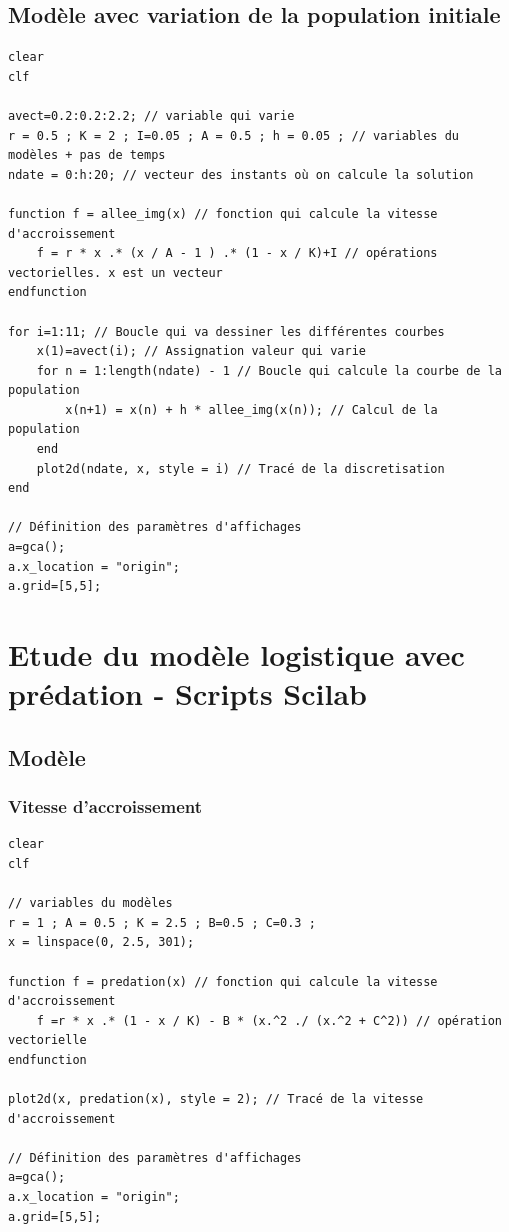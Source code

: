 \documentclass{article}
\begin{document}
\subsection{Modèle avec variation de la population initiale}

\begin{verbatim}
clear
clf

avect=0.2:0.2:2.2; // variable qui varie
r = 0.5 ; K = 2 ; I=0.05 ; A = 0.5 ; h = 0.05 ; // variables du modèles + pas de temps
ndate = 0:h:20; // vecteur des instants où on calcule la solution

function f = allee_img(x) // fonction qui calcule la vitesse d'accroissement
    f = r * x .* (x / A - 1 ) .* (1 - x / K)+I // opérations vectorielles. x est un vecteur
endfunction

for i=1:11; // Boucle qui va dessiner les différentes courbes
    x(1)=avect(i); // Assignation valeur qui varie
    for n = 1:length(ndate) - 1 // Boucle qui calcule la courbe de la population
        x(n+1) = x(n) + h * allee_img(x(n)); // Calcul de la population
    end 
    plot2d(ndate, x, style = i) // Tracé de la discretisation
end

// Définition des paramètres d'affichages
a=gca();
a.x_location = "origin";
a.grid=[5,5];
\end{verbatim}

\section{Etude du modèle logistique avec prédation - Scripts Scilab}

\subsection{Modèle}

\subsubsection{Vitesse d'accroissement}

\begin{verbatim}
clear
clf

// variables du modèles
r = 1 ; A = 0.5 ; K = 2.5 ; B=0.5 ; C=0.3 ;
x = linspace(0, 2.5, 301);

function f = predation(x) // fonction qui calcule la vitesse d'accroissement
    f =r * x .* (1 - x / K) - B * (x.^2 ./ (x.^2 + C^2)) // opération vectorielle
endfunction

plot2d(x, predation(x), style = 2); // Tracé de la vitesse d'accroissement

// Définition des paramètres d'affichages
a=gca();
a.x_location = "origin";
a.grid=[5,5];
\end{verbatim}
\end{document}
